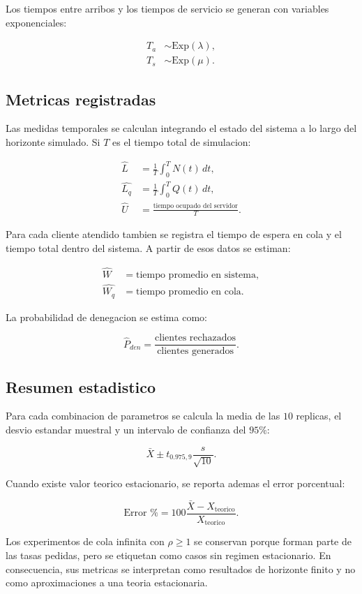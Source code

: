 Los tiempos entre arribos y los tiempos de servicio se generan con variables exponenciales:

\begin{align}
    T_a &\sim \mathrm{Exp}(\lambda), \\
    T_s &\sim \mathrm{Exp}(\mu).
\end{align}

\subsection{Metricas registradas}

Las medidas temporales se calculan integrando el estado del sistema a lo largo del horizonte simulado. Si $T$ es el tiempo total de simulacion:

\begin{align}
    \widehat{L} &= \frac{1}{T}\int_0^T N(t)\,dt, \\
    \widehat{L_q} &= \frac{1}{T}\int_0^T Q(t)\,dt, \\
    \widehat{U} &= \frac{\text{tiempo ocupado del servidor}}{T}.
\end{align}

Para cada cliente atendido tambien se registra el tiempo de espera en cola y el tiempo total dentro del sistema. A partir de esos datos se estiman:

\begin{align}
    \widehat{W} &= \text{tiempo promedio en sistema}, \\
    \widehat{W_q} &= \text{tiempo promedio en cola}.
\end{align}

La probabilidad de denegacion se estima como:

\begin{equation}
    \widehat{P}_{den} =
    \frac{\text{clientes rechazados}}{\text{clientes generados}}.
\end{equation}

\subsection{Resumen estadistico}

Para cada combinacion de parametros se calcula la media de las $10$ replicas, el desvio estandar muestral y un intervalo de confianza del $95\%$:

\begin{equation}
    \bar{X} \pm t_{0.975,9}\frac{s}{\sqrt{10}}.
\end{equation}

Cuando existe valor teorico estacionario, se reporta ademas el error porcentual:

\begin{equation}
    \text{Error \%} =
    100 \frac{\bar{X} - X_{\mathrm{teorico}}}{X_{\mathrm{teorico}}}.
\end{equation}

Los experimentos de cola infinita con $\rho \geq 1$ se conservan porque forman parte de las tasas pedidas, pero se etiquetan como casos sin regimen estacionario. En consecuencia, sus metricas se interpretan como resultados de horizonte finito y no como aproximaciones a una teoria estacionaria.
